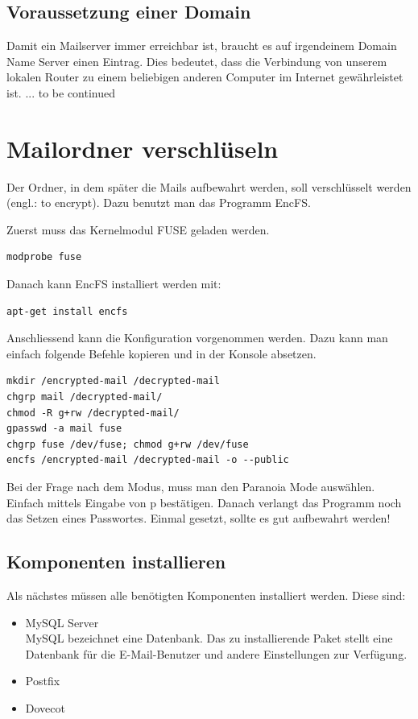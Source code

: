 \subsection{Voraussetzung einer Domain}
Damit ein Mailserver immer erreichbar ist, braucht es auf irgendeinem Domain Name Server einen Eintrag. Dies bedeutet, dass die Verbindung von unserem lokalen Router zu einem beliebigen anderen Computer im Internet gewährleistet ist.
... to be continued

\section{Mailordner verschlüseln}
Der Ordner, in dem später die Mails aufbewahrt werden, soll verschlüsselt werden (engl.: to encrypt). Dazu benutzt man das Programm EncFS.

Zuerst muss das Kernelmodul FUSE geladen werden. 

\begin{lstlisting}
modprobe fuse
\end{lstlisting}

Danach kann EncFS installiert werden mit: 
\begin{lstlisting}
apt-get install encfs
\end{lstlisting}

Anschliessend kann die Konfiguration vorgenommen werden. Dazu kann man einfach folgende Befehle kopieren und in der Konsole absetzen.

\begin{lstlisting}
mkdir /encrypted-mail /decrypted-mail
chgrp mail /decrypted-mail/
chmod -R g+rw /decrypted-mail/
gpasswd -a mail fuse
chgrp fuse /dev/fuse; chmod g+rw /dev/fuse
encfs /encrypted-mail /decrypted-mail -o --public
\end{lstlisting}

Bei der Frage nach dem Modus, muss man den Paranoia Mode auswählen. Einfach mittels Eingabe von p bestätigen. Danach verlangt das Programm noch das Setzen eines Passwortes. Einmal gesetzt, sollte es gut aufbewahrt werden!

\subsection{Komponenten installieren}
Als nächstes müssen alle benötigten Komponenten installiert werden.
Diese sind: 
\begin{itemize}
\item MySQL Server \\
MySQL bezeichnet eine Datenbank. Das zu installierende Paket stellt eine Datenbank für die E-Mail-Benutzer und andere Einstellungen zur Verfügung.

\item Postfix \\

\item Dovecot \\

\end{itemize}

